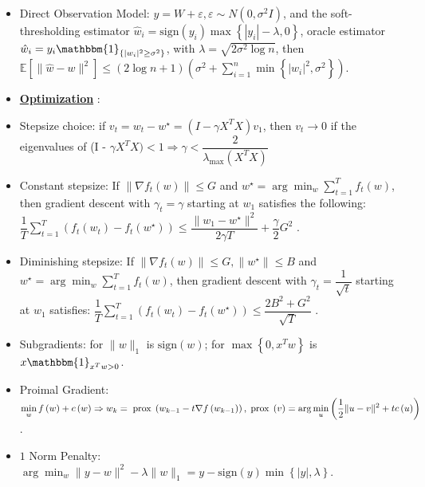 \documentclass{article}
\begin{document}
\begin{itemize}
\item Direct Observation Model: $y  = W  + \varepsilon, \varepsilon \sim  N\left(0, \sigma^{2} I \right)$, and the soft-thresholding estimator $\hat{w}_{i} = \text{sign}\left(y_{i}\right) \displaystyle\max\left\{| y_{i} | - \lambda, 0\right\}$, oracle estimator $\hat{w}_{i} = y_{i} \mathbbm{1}_{\left\{| w_{i} |^{2} \geq  \sigma^{2}\right\}}$, with $\lambda = \sqrt{2 \sigma^{2} \log n}$, then $\mathbb{E}\left[\| \hat{w} - w \|^{2}\right] \leq  \left(2 \log n + 1\right) \left(\sigma^{2} + \displaystyle\sum_{i=1}^{n} \displaystyle\min\left\{ | w_{i} |^{2}, \sigma^{2} \right\}\right)$.
\item \textbf{\underline{Optimization}} :
\item Stepsize choice: if $v_{t} = w_{t} - w^\star  = \left(I - \gamma X^{T} X\right) v_{1}$, then $v_{t} \to  0$ if the eigenvalues of (I - $\gamma X^{T} X) < 1 \Rightarrow  \gamma < \dfrac{2}{\lambda_{\displaystyle\max} \left(X^{T} X\right)}$
\item Constant stepsize: If $\| \nabla  f_{t}\left(w\right) \| \leq  G$ and $w^\star  = \arg\displaystyle\min_{w} \displaystyle\sum_{t=1}^{T} f_{t}\left(w\right)$, then gradient descent with $\gamma_{t} = \gamma$ starting at $w_{1}$ satisfies the following: $\dfrac{1}{T} \displaystyle\sum_{t=1}^{T} \left(f_{t}\left(w_{t}\right) - f_{t}\left(w^\star \right)\right) \leq  \dfrac{\| w_{1} - w^\star  \|^{2}}{2 \gamma T} + \dfrac{\gamma}{2} G^{2}$ .
\item Diminishing stepsize: If $\| \nabla  f_{t}\left(w\right) \| \leq  G, \| w^\star  \| \leq  B$ and $w^\star  = \arg\displaystyle\min_{w} \displaystyle\sum_{t=1}^{T} f_{t}\left(w\right)$, then gradient descent with $\gamma_{t} = \dfrac{1}{\sqrt{t}}$ starting at $w_{1}$ satisfies: $\dfrac{1}{T} \displaystyle\sum_{t=1}^{T} \left(f_{t}\left(w_{t}\right) - f_{t}\left(w^\star \right)\right) \leq  \dfrac{2 B^{2} + G^{2}}{\sqrt{T}}$ .
\item Subgradients: for $\| w \|_{1}$ is $\text{sign}\left(w \right)$; for $\displaystyle\max\left\{0, x^{T} w \right\}$ is $x  \mathbbm{1}_{x^{T} w > 0}$.
\item Proimal Gradient: $\displaystyle\min_{w} f\left(w\right) + c\left(w\right) \Rightarrow  w_{k} = \text{\;prox\;} \left(w_{k-1} - t \nabla  f\left(w_{k-1}\right)\right), \text{\;prox\;} \left(v\right) = \arg\displaystyle\min_{u} \left(\dfrac{1}{2} \| u - v \|^{2} + t c\left(u\right)\right)$.
\item $1$ Norm Penalty: $\arg\displaystyle\min_{w} \| y - w \|^{2} - \lambda \| w \|_{1} = y - \text{sign}\left(y\right) \displaystyle\min\left\{| y |, \lambda\right\}$.

\end{itemize}
\end{document}
